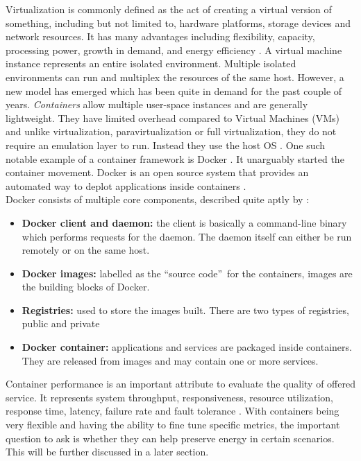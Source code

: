 Virtualization is commonly defined as the act of creating a virtual version of something, 
including but not limited to, hardware platforms, storage devices and network resources. It has many advantages 
including flexibility, capacity, processing power, growth in demand, and energy efficiency \cite{8360360}. A virtual 
machine instance represents an entire isolated environment. Multiple isolated environments can run and multiplex the 
resources of the same host. However, a new model has emerged which has been quite in demand for the past couple of years. 
\textit{Containers} \cite{turnbull_2014} allow multiple user-space instances and are generally lightweight. They have 
limited overhead compared to Virtual Machines (VMs) and unlike virtualization, paravirtualization or full virtualization, 
they do not require an emulation layer to run. Instead they use the host OS \cite{6903537}. One such notable example 
of a container framework is Docker \cite{turnbull_2014}. It unarguably started the container movement. Docker is an open source 
system that provides an automated way to deplot applications inside containers \cite{8360360}. \\
Docker consists of multiple core components, described quite aptly by \cite{turnbull_2014}: 
\begin{itemize}
    \item \textbf{Docker client and daemon: }the client is basically a command-line binary which performs requests for the daemon. The daemon itself can either be run remotely or on the same host.
    \item \textbf{Docker images: }labelled as the \textquotedblleft source code\textquotedblright \ for the containers, images are the building blocks of Docker.
    \item \textbf{Registries: }used to store the images built. There are two types of registries, public and private
    \item \textbf{Docker container: }applications and services are packaged inside containers. They are released from images and may contain one or more services.
\end{itemize}

Container performance is an important attribute to evaluate the quality of offered service. It represents 
system throughput, responsiveness, resource utilization, response time, latency, failure rate and fault 
tolerance \cite{perfcont}. With containers being very flexible and having the ability to fine tune specific metrics, 
the important question to ask is whether they can help preserve energy in certain scenarios. This will be further discussed 
in a later section. \\

